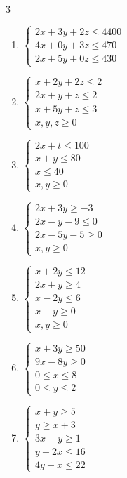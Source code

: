 \begin{Ejer}
\begin{multicols}{3}
\begin{enumerate}
\item $\left\{
\begin{array}{c}
2x+3y+2z\leq4400\\
4x+0y+3z\leq470\\
2x+5y+0z\leq430\end{array}
\right.$

\item $\left\{
\begin{array}{c}
x+2y+2z\leq2\\
2x+y+z\leq2\\
x+5y+z\leq3\\
x,y,z\geq0\end{array}
\right.$

\item $\left\{
\begin{array}{c}
2x+t\leq100\\
x+y\leq80\\
x\leq40\\
x,y\geq0\end{array}
\right.$

\item $\left\{
\begin{array}{c}
2x+3y\geq-3\\
2x-y-9\leq0\\
2x-5y-5\geq0\\
x,y\geq0\end{array}
\right.$

\item $\left\{
\begin{array}{c}
x+2y\leq12\\
2x+y\geq4\\
x-2y\leq6\\
x-y\geq0\\
x,y\geq0\end{array}
\right.$

\item $\left\{
\begin{array}{c}
x+3y\geq50\\
9x-8y\geq0\\
0\leq x\leq8\\
0\leq y\leq2\end{array}
\right.$


\item $\left\{
\begin{array}{c}
x+y\geq5\\
y\geq x+3\\
3x-y\geq1\\
y+2x\leq16\\
4y-x\leq22
\end{array}
\right.$



\end{enumerate}
\end{multicols}
\end{Ejer}

